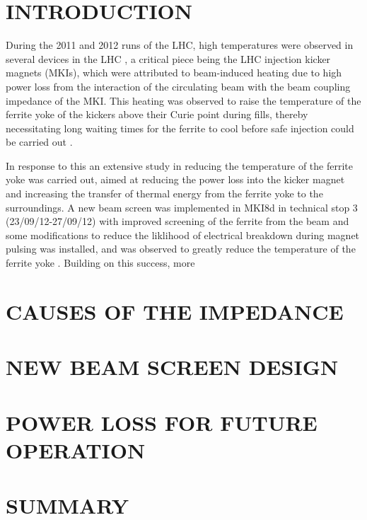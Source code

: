 \documentclass{JAC2003}
\begin{document}
% 

\section{INTRODUCTION}

During the 2011 and 2012 runs of the LHC, high temperatures were observed in several devices in the LHC  \cite{metral_cham2012}, a critical piece being the LHC injection kicker magnets (MKIs), which were attributed to beam-induced heating due to high power loss from the interaction of the circulating beam with the beam coupling impedance of the MKI. This heating was observed to raise the temperature of the ferrite yoke of the kickers above their Curie point during fills, thereby necessitating long waiting times for the ferrite to cool before safe injection could be carried out \cite{mki-heating}. 

In response to this an extensive study in reducing the temperature of the ferrite yoke was carried out, aimed at reducing the power loss into the kicker magnet and increasing the transfer of thermal energy from the ferrite yoke to the surroundings. A new beam screen was implemented in MKI8d in technical stop 3 (23/09/12-27/09/12) with improved screening of the ferrite from the beam and some modifications to reduce the liklihood of electrical breakdown during magnet pulsing was installed, and was observed to greatly reduce the temperature of the ferrite yoke \cite{mki-heatingTemp}. Building on this success, more 


\section{CAUSES OF THE IMPEDANCE}

\section{NEW BEAM SCREEN DESIGN}

\section{POWER LOSS FOR FUTURE OPERATION}

\section{SUMMARY}
\end{document}
